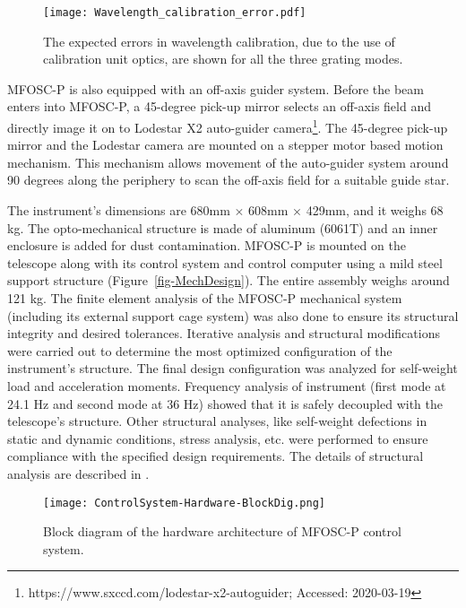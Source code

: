 \begin{figure}
	\centering
	\texttt{[image: Wavelength\_calibration\_error.pdf]}
	\vspace{0.2cm}
	\caption{The expected errors in wavelength calibration, due to the use of calibration unit optics, are shown for all the three grating modes.}
	\label{fig-WaveCalibeError}
\end{figure}

\par 
MFOSC-P is also equipped with an off-axis guider system. Before the beam enters into MFOSC-P, a 45-degree pick-up mirror selects an off-axis field and directly image it on to Lodestar X2 auto-guider camera\footnote{https://www.sxccd.com/lodestar-x2-autoguider; Accessed: 2020-03-19}. The 45-degree pick-up mirror and the Lodestar camera are mounted on a stepper motor based motion mechanism. This mechanism allows movement of the auto-guider system around 90 degrees along the periphery to scan the off-axis field for a suitable guide star.
\par 
The instrument's dimensions are 680mm $\times$ 608mm $\times$ 429mm, and it weighs 68 kg. The opto-mechanical structure is made of aluminum (6061T) and an inner enclosure is added for dust contamination. MFOSC-P is mounted on the telescope along with its control system and control computer using a mild steel support structure (Figure~\ref{fig-MechDesign}). The entire assembly weighs around 121 kg. The finite element analysis of the MFOSC-P mechanical system (including its external support cage system) was also done to ensure its structural integrity and desired tolerances. Iterative analysis and structural modifications were carried out to determine the most optimized configuration of the instrument's structure. The final design configuration was analyzed for self-weight load and acceleration moments. Frequency analysis of instrument (first mode at 24.1 Hz and second mode at 36 Hz) showed that it is safely decoupled with the telescope's structure. Other structural analyses, like self-weight defections in static and dynamic conditions, stress analysis, etc. were performed to ensure compliance with the specified design requirements. The details of structural analysis are described in \cite{Srivastava2018}.


\begin{figure}
	\centering
	\texttt{[image: ControlSystem-Hardware-BlockDig.png]}
	\vspace{0.2cm}
	\caption{Block diagram of the hardware architecture of MFOSC-P control system.}
	\label{fig-ControlSys-Hardware}
\end{figure}

